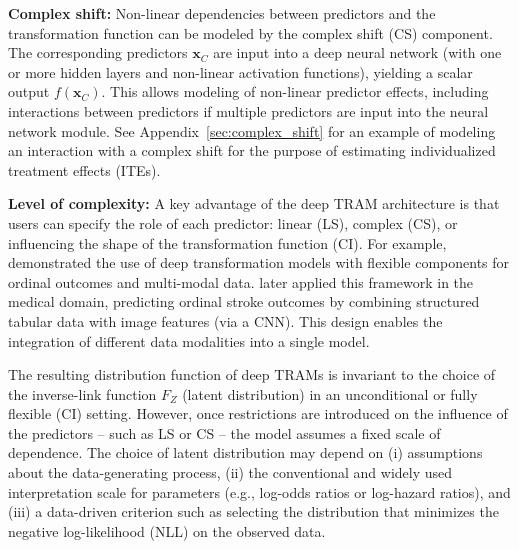 \medskip

\textbf{Complex shift:} Non-linear dependencies between predictors and the transformation function can be modeled by the complex shift (CS) component. The corresponding predictors $\mathbf{x}_{C}$ are input into a deep neural network (with one or more hidden layers and non-linear activation functions), yielding a scalar output $f(\mathbf{x}_{C})$. This allows modeling of non-linear predictor effects, including interactions between predictors if multiple predictors are input into the neural network module. See Appendix~\ref{sec:complex_shift} for an example of modeling an interaction with a complex shift for the purpose of estimating individualized treatment effects (ITEs).

\medskip


\textbf{Level of complexity:} A key advantage of the deep TRAM architecture is that users can specify the role of each predictor: linear (LS), complex (CS), or influencing the shape of the transformation function (CI). For example, \citet{kook2022} demonstrated the use of deep transformation models with flexible components for ordinal outcomes and multi-modal data. \citet{herzog2023} later applied this framework in the medical domain, predicting ordinal stroke outcomes by combining structured tabular data with image features (via a CNN). This design enables the integration of different data modalities into a single model.



\medskip

The resulting distribution function of deep TRAMs is invariant to the choice of the inverse-link function $F_Z$ (latent distribution) in an unconditional \citep{hothorn2018} or fully flexible (CI) setting. However, once restrictions are introduced on the influence of the predictors -- such as LS or CS -- the model assumes a fixed scale of dependence. The choice of latent distribution may depend on (i) assumptions about the data-generating process, (ii) the conventional and widely used interpretation scale for parameters (e.g., log-odds ratios or log-hazard ratios), and (iii) a data-driven criterion such as selecting the distribution that minimizes the negative log-likelihood (NLL) on the observed data.

